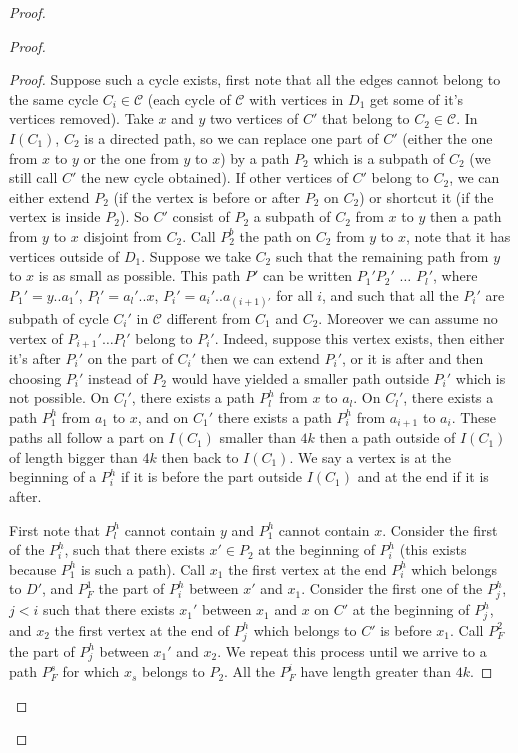 \documentclass[utf8,10pt]{article}
\theoremstyle{plain}
\theoremstyle{definition}
\theoremstyle{remark}
\begin{document}
\begin{proof}
\begin{proof}
\begin{proof}
Suppose such a cycle exists, first note that all the edges cannot belong to the same cycle $C_i \in \mathcal{C}$
(each cycle of $\mathcal{C}$ with vertices in $D_1$ get some of it's vertices removed).
Take $x$ and $y$ two vertices of $C'$ that belong to $C_2 \in \mathcal{C}$. In $I(C_1)$, $C_2$ is a directed path,
so we can replace one part of $C'$ (either the one from $x$ to $y$ or the one from $y$ to $x$) by a path $P_2$
 which is a subpath of $C_2$ (we still call $C'$ the new cycle obtained).
If other vertices of $C'$ belong to $C_2$, we can either extend
$P_2$ (if the vertex is before or after $P_2$ on $C_2$)
or shortcut it (if the vertex is inside $P_2$). So $C'$ consist of $P_2$ a subpath of
$C_2$ from $x$ to $y$ then a path from $y$ to $x$ disjoint from $C_2$.
Call $P_2^b$ the path on $C_2$ from $y$ to $x$, note that it has vertices outside of $D_1$.
Suppose we take $C_2$ such that the remaining path from $y$ to $x$ is as small as possible.
This path $P'$ can be written $P_1'P_2'$ $\dots$ $P_l'$, where $P_1' = y..a_1'$,
$P_l' = a_l' ..x$, $P_i' = a_i'..a_{(i+1)'}$ for all $i$, and such that all
the $P_i'$ are subpath of cycle $C_i'$ in $\mathcal{C}$ different from $C_1$ and $C_2$.
Moreover we can assume no vertex of $P_{i+1}' \dots P_l'$ belong to $P_i'$. Indeed, suppose this vertex
exists, then either it's after $P_i'$ on the part of $C_i'$ then we can extend $P_i'$, or it is after and then
choosing $P_i'$ instead of $P_2$ would have yielded a smaller path outside $P_i'$ which is not possible.
On $C_l'$, there exists a path $P_l^h$ from $x$ to $a_l$. On $C_l'$, there exists a path $P_1^h$ from $a_1$ to $x$, and
on $C_1'$ there exists a path $P_i^h$ from $a_{i+1}$ to $a_i$. These paths all follow a part
on $I(C_1)$ smaller than $4k$ then a path outside of $I(C_1)$ of length bigger than
$4k$ then back to $I(C_1)$. We say a vertex is at the beginning of a $P_i^h$ if it is
before the part outside $I(C_1)$ and at the end if it is after.

First note that $P_l^h$ cannot contain $y$ and $P_1^h$ cannot contain $x$.
Consider the first of the $P_i^h$, such that there exists $x' \in P_2$ at the beginning of $P_i^h$
(this exists because $P_1^h$ is such a path). Call $x_1$ the first vertex at the end $P_i^h$ which belongs to
$D'$, and $P_F^1$ the part of $P_i^h$ between $x'$ and $x_1$.
Consider the first one of the $P_j^h$, $j<i$ such that there exists $x_1'$ between $x_1$ and $x$ on
$C'$ at the beginning of $P_j^h$, and $x_2$ the first vertex at the end of $P_j^h$ which belongs to $C'$ is before $x_1$.
Call $P_F^2$ the part of $P_j^h$ between $x_1'$ and $x_2$.
We repeat this process until we arrive to a path $P_F^s$ for which $x_s$ belongs to $P_2$.
All the $P_F^i$ have length greater than $4k$.


\end{proof}
\end{proof}
\end{proof}
\end{document}
